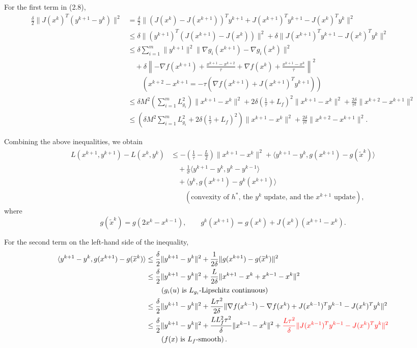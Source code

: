 \documentclass[11pt]{article}
\numberwithin{equation}{section}
\begin{document}
For the first term in (2.8),
\begin{align*}
\frac{\delta}{2}\|J(x^k)^T(y^{k+1}-y^k)\|^2
&=\frac{\delta}{2}\| (J(x^k)-J(x^{k+1}))^Ty^{k+1}
+J(x^{k+1})^Ty^{k+1}-J(x^k)^Ty^k\|^2\\
&\le \delta\|(y^{k+1})^T(J(x^{k+1})-J(x^k))\|^2
+\delta\|J(x^{k+1})^Ty^{k+1}-J(x^k)^Ty^k\|^2\\
&\le \delta\sum_{i=1}^m\|y^{k+1}\|^2
\|\nabla g_i(x^{k+1})-\nabla g_i(x^k)\|^2\\
&\quad+\delta\left\|-\nabla f(x^{k+1})+\frac{x^{k+1}-x^{k+2}}{\tau}
+\nabla f(x^k)+\frac{x^{k+1}-x^k}{\tau}\right\|^2\\
&\qquad\left(x^{k+2}-x^{k+1}=-\tau\left(\nabla f(x^{k+1})+J(x^{k+1})^Ty^{k+1}\right)\right)\\
&\le \delta M^2\left(\sum_{i=1}^mL_{g_i}^2\right)\|x^{k+1}-x^k\|^2
+2\delta\left(\frac{1}{\tau}+L_f\right)^2\|x^{k+1}-x^k\|^2
+\frac{2\delta}{\tau^2}\|x^{k+2}-x^{k+1}\|^2\\
&\le \left(\delta M^2\sum_{i=1}^mL_{g_i}^2
+2\delta\left(\frac{1}{\tau}+L_f\right)^2\right)\|x^{k+1}-x^k\|^2
+\frac{2\delta}{\tau^2}\|x^{k+2}-x^{k+1}\|^2. \tag{2.11}
\end{align*}

Combining the above inequalities, we obtain
\begin{align*}
L(x^{k+1},y^{k+1})-L(x^k,y^k)
&\le -\left(\frac{1}{\tau}-\frac{L}{2}\right)\|x^{k+1}-x^k\|^2
+\langle y^{k+1}-y^k,g(x^{k+1})-g(\widetilde{x}^k)\rangle\\
&\quad+\frac{1}{\sigma}\langle y^{k+1}-y^k,y^k-y^{k-1}\rangle\\
&\quad+\langle y^k,g(x^{k+1})-g^k(x^{k+1})\rangle\\
&\qquad\left(\text{convexity of $h^*$, the $y^k$ update, and the $x^{k+1}$ update}\right),
\end{align*}
where
\[
g(\widetilde{x}^k)=g(2x^k-x^{k-1}),
\qquad
g^k(x^{k+1})=g(x^k)+J(x^k)(x^{k+1}-x^k).
\]

For the second term on the left-hand side of the inequality,
\begin{align*}
\langle y^{k+1}-y^k,g(x^{k+1})-g(\widetilde{x}^k)\rangle
&\le \frac{\delta}{2}\|y^{k+1}-y^k\|^2
+\frac{1}{2\delta}\|g(x^{k+1})-g(\widetilde{x}^k)\|^2\\
&\le \frac{\delta}{2}\|y^{k+1}-y^k\|^2
+\frac{L}{2\delta}\|x^{k+1}-x^k+x^{k-1}-x^k\|^2\\
&\qquad\left(g_i(u)\text{ is $L_{g_i}$-Lipschitz continuous}\right)\\
&\le \frac{\delta}{2}\|y^{k+1}-y^k\|^2
+\frac{L\tau^2}{2\delta}\|\nabla f(x^{k-1})-\nabla f(x^k)
+J(x^{k-1})^Ty^{k-1}-J(x^k)^Ty^k\|^2\\
&\le \frac{\delta}{2}\|y^{k+1}-y^k\|^2
+\frac{LL_f^2\tau^2}{\delta}\|x^{k-1}-x^k\|^2
+\textcolor{red}{\frac{L\tau^2}{\delta}\|J(x^{k-1})^Ty^{k-1}-J(x^k)^Ty^k\|^2}\\
&\qquad\left(f(x)\text{ is $L_f$-smooth}\right).
\end{align*}
\end{document}
